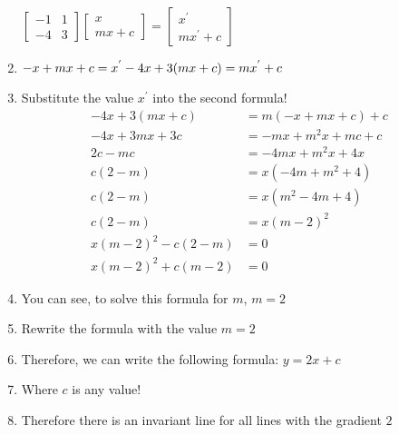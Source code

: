 \documentclass{article}[12pt]
\begin{document}
\begin{minipage}{\textwidth}
\begin{enumerate}
    \(\begin{bmatrix} -1 & 1 \\ -4 & 3 \end{bmatrix}\begin{bmatrix} x \\ mx+c \end{bmatrix} = \begin{bmatrix} x^{'} \\ mx^{'}+c \end{bmatrix}\)
    \item 
    \(-x + mx+c = x^{'} \\
    -4x + 3(mx+c) = mx^{'} + c\)
    \item Substitute the value $x^{'}$ into the second formula!
    \begin{equation}
        \begin{aligned}
        -4x + 3(mx+c) &= m(-x + mx+c) + c \\
        -4x + 3mx + 3c &= -mx + m^{2}x+mc + c \\
        2c - mc &= -4mx + m^{2}x + 4x \\
        c(2-m) &= x(-4m + m^{2} + 4) \\ 
        c(2-m) &= x(m^{2} - 4m + 4) \\
        c(2-m) &= x(m-2)^2 \\
        x(m-2)^2 - c(2-m) &= 0 \\
        x(m-2)^2 + c(m-2) &= 0 
        \end{aligned}
    \end{equation}
    \item You can see, to solve this formula for $m$, $m = 2$
    \item Rewrite the formula with the value $m = 2$
    \item Therefore, we can write the following formula: $y = 2x + c$
    \item Where $c$ is any value!
    \item Therefore there is an invariant line for all lines with the gradient $2$
\end{enumerate}
\end{minipage}
\end{document}
